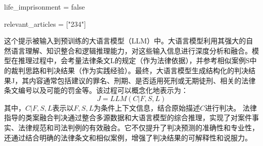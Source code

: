 life\_imprisonment = false

relevant\_articles = ["234"]

这个提示被输入到预训练的大语言模型（LLM）中。大语言模型利用其强大的自然语言理解、知识整合和逻辑推理能力，对这些输入信息进行深度分析和融合。模型在推理过程中，会考量法律条文L的规定（作为法律依据），并参考相似案例S中的裁判思路和判决结果（作为实践经验）。最终，大语言模型生成结构化的判决结果J，其内容通常包括建议的罪名、刑期、是否适用死刑或无期徒刑、相关的法律条文编号以及可能的罚金等。该过程可以概念化地表示为：
$$
	J=LLM(C|F,S,L)
$$
其中，$C | F,S,L $表示以$F,S,L$为条件上下文信息，结合原始描述$C$进行判决。
法律指导的类案融合判决通过整合多源数据和大语言模型的综合推理，实现了对案件事实、法律规范和司法判例的有效融合。它不仅提升了判决预测的准确性和专业性，还通过结合明确的法律条文和相似案例，增强了判决结果的可解释性和说服力。
